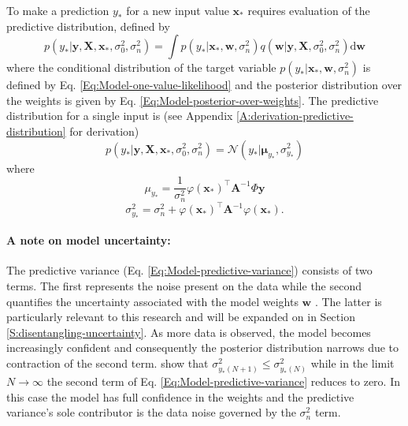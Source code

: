 To make a prediction $y_{*}$ for a new input value $\textbf{x}_{*}$ requires evaluation of the predictive distribution, defined by
\begin{equation}
   p(y_{*} | \mathbf{y},\mathbf{X},\mathbf{x}_{*}, \sigma_{0}^{2}, \sigma_{n}^{2})=\int p(y_{*} | \mathbf{x}_{*}, \mathbf{w}, \sigma_{n}^{2}) q(\mathbf{w} | \mathbf{y}, \mathbf{X}, \sigma_{0}^{2}, \sigma_{n}^{2}) \mathrm{d} \mathbf{w}
\end{equation}
where the conditional distribution of the target variable $p(y_{*} | \mathbf{x}_{*}, \mathbf{w}, \sigma_{n}^{2})$ is defined by Eq. \ref{Eq:Model-one-value-likelihood} and the posterior distribution over the weights is given by Eq. \ref{Eq:Model-posterior-over-weights}. The predictive distribution for a single input is (see Appendix \ref{A:derivation-predictive-distribution} for derivation)
\begin{equation}
    p(y_{*} | \mathbf{y},\mathbf{X},\mathbf{x}_{*}, \sigma_{0}^{2}, \sigma_{n}^{2}) = \mathcal{N}\left(y_{*} | \mathbf{\mu}_{y_{*}}, \sigma_{y_{*}}^{2}\right)
    \label{Eq:Model-predicitive-distribution}
\end{equation}
where
\begin{equation}
    \mu_{y_{*}} = \frac{1}{\sigma_{n}^{2}}\varphi(\mathbf{x}_{*})^{\top} \mathbf{A}^{-1} \Phi \mathbf{y}
\end{equation}
\begin{equation}
    \sigma_{y_{*}}^{2}=\sigma_{n}^{2} + \varphi(\mathbf{x}_{*})^{\top}\mathbf{A}^{-1}\varphi(\mathbf{x}_{*}).
    \label{Eq:Model-predictive-variance}
\end{equation}
\paragraph{A note on model uncertainty:} The predictive variance (Eq. \ref{Eq:Model-predictive-variance}) consists of two terms. The first represents the noise present on the data while the second quantifies the uncertainty associated with the model weights $\textbf{w}$ \cite{bishop2006pattern}. The latter is particularly relevant to this research and will be expanded on in Section \ref{S:disentangling-uncertainty}. As more data is observed, the model becomes increasingly confident and consequently the posterior distribution narrows due to contraction of the second term. \citet{qazaz1997upper} show that $\sigma_{y_{*}(N+1)}^{2} \leqslant \sigma_{y_{*}(N)}^{2}$ while in the limit $N \to \infty$ the second term of Eq. \ref{Eq:Model-predictive-variance} reduces to zero. In this case the model has full confidence in the weights and the predictive variance's sole contributor is the data noise governed by the $\sigma_{n}^2$ term.

